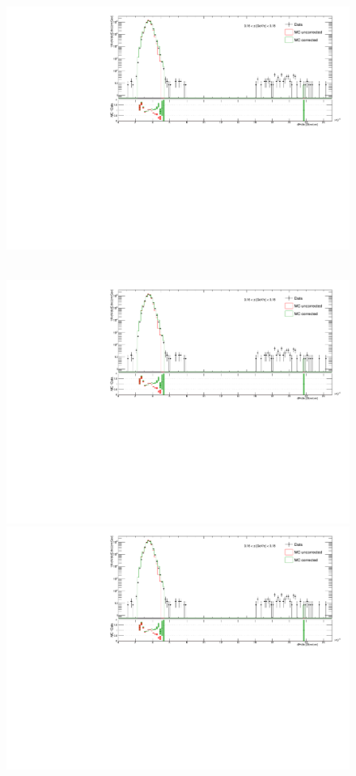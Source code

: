 \begin{figure}[hb]
{  \includegraphics[width=\linewidth,page=34]{graphics/corrections/dEdx_DataVsMC.pdf}
}~
\parbox{0.495\textwidth}{
  \centering
  \includegraphics[width=\linewidth,page=9]{graphics/corrections/dEdx_DataVsMC.pdf}\\
  \includegraphics[width=\linewidth,page=19]{graphics/corrections/dEdx_DataVsMC.pdf}\\
}
\end{figure}
